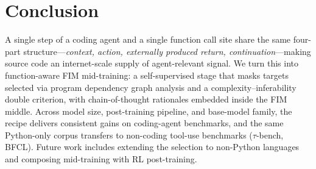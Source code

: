 \section{Conclusion}
\vspace{-0.5ex}
\label{sec:conclusion}
A single step of a coding agent and a single function call site share
the same four-part structure---\textit{context, action, externally
produced return, continuation}---making source code an internet-scale
supply of agent-relevant signal. We turn this into function-aware FIM
mid-training: a self-supervised stage that masks targets selected via
program dependency graph analysis and a complexity--inferability
double criterion, with chain-of-thought rationales embedded inside the
FIM middle. Across model size, post-training pipeline, and base-model
family, the recipe delivers consistent gains on coding-agent
benchmarks, and the same Python-only corpus transfers to non-coding
tool-use benchmarks ($\tau$-bench, BFCL). Future work includes
extending the selection to non-Python languages and composing
mid-training with RL post-training.
